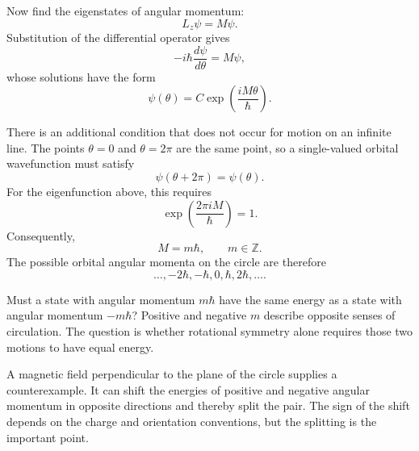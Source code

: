 Now find the eigenstates of angular momentum:
\begin{equation}
L_z\psi=M\psi.
\end{equation}
Substitution of the differential operator gives
\begin{equation}
-i\hbar\frac{d\psi}{d\theta}=M\psi,
\end{equation}
whose solutions have the form
\begin{equation}
\psi(\theta)=C\exp\left(\frac{iM\theta}{\hbar}\right).
\end{equation}

There is an additional condition that does not occur for motion on an infinite line. The points \(\theta=0\) and \(\theta=2\pi\) are the same point, so a single-valued orbital wavefunction must satisfy
\begin{equation}
\psi(\theta+2\pi)=\psi(\theta).
\end{equation}
For the eigenfunction above, this requires
\begin{equation}
\exp\left(\frac{2\pi iM}{\hbar}\right)=1.
\end{equation}
Consequently,
\begin{equation}
M=m\hbar,
\qquad
m\in\mathbb Z.
\end{equation}
The possible orbital angular momenta on the circle are therefore
\begin{equation}
\ldots,-2\hbar,-\hbar,0,\hbar,2\hbar,\ldots.
\end{equation}

Must a state with angular momentum \(m\hbar\) have the same energy as a state with angular momentum \(-m\hbar\)? Positive and negative \(m\) describe opposite senses of circulation. The question is whether rotational symmetry alone requires those two motions to have equal energy.

\begin{classroomqa}
\end{classroomqa}

A magnetic field perpendicular to the plane of the circle supplies a counterexample. It can shift the energies of positive and negative angular momentum in opposite directions and thereby split the pair. The sign of the shift depends on the charge and orientation conventions, but the splitting is the important point.

